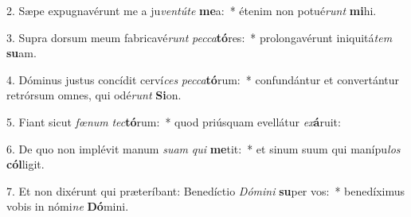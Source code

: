 2. Sæpe expugnavérunt me a ju\textit{ven}\textit{tú}\textit{te} \textbf{me}a:~*  étenim non potué\textit{runt} \textbf{mi}hi.\

3. Supra dorsum meum fabricavé\textit{runt} \textit{pec}\textit{ca}\textbf{tó}res:~*  prolongavérunt iniquitá\textit{tem} \textbf{su}am.\

4. Dóminus justus concídit cerví\textit{ces} \textit{pec}\textit{ca}\textbf{tó}rum:~*  confundántur et convertántur retrórsum omnes, qui odé\textit{runt} \textbf{Si}on.\

5. Fiant sicut \textit{fœ}\textit{num} \textit{tec}\textbf{tó}rum:~*  quod priúsquam evellátur \textit{ex}\textbf{á}ruit:\

6. De quo non implévit manum \textit{su}\textit{am} \textit{qui} \textbf{me}tit:~*  et sinum suum qui manípu\textit{los} \textbf{cól}ligit.\

7. Et non dixérunt qui præteríbant: Benedíctio \textit{Dó}\textit{mi}\textit{ni} \textbf{su}per vos:~*  benedíximus vobis in nómi\textit{ne} \textbf{Dó}mini.\

